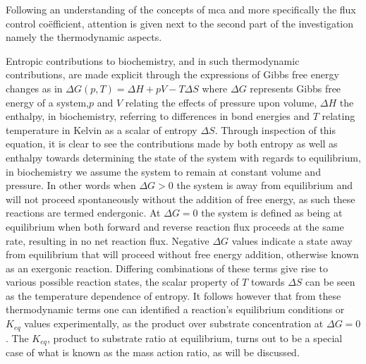 Following an understanding of the concepts of \gls{mca} and more specifically the flux control co\"efficient, attention is given next to the second part of the investigation namely the thermodynamic aspects.



Entropic contributions to biochemistry, and in such thermodynamic contributions, are made explicit through the expressions of Gibbs free energy changes as in $\Delta G(p,T)=\Delta H+pV-T\Delta S$ where $\Delta G$ represents Gibbs free energy of a system,$p$ and $V$ relating the effects of pressure upon volume, $\Delta H$ the enthalpy, in biochemistry, referring to differences in bond energies and $T$ relating temperature in Kelvin as a scalar of entropy $\Delta S$. Through inspection of this equation, it is clear to see the contributions made by both entropy as well as enthalpy towards determining the state of the system with regards to equilibrium, in biochemistry we assume the system to remain at constant volume and pressure. In other words when $\Delta G > 0$ the system is away from equilibrium and will not proceed spontaneously without the addition of free energy, as such these reactions are termed endergonic. At $\Delta G = 0$ the system is defined as being at equilibrium when both forward and reverse reaction flux proceeds at the same rate, resulting in no net reaction flux. Negative $\Delta G$ values indicate a state away from equilibrium that will proceed without free energy addition, otherwise known as an exergonic reaction. Differing combinations of these terms give rise to various possible reaction states, the scalar property of $T$ towards $\Delta S$ can be seen as the temperature dependence of entropy. It follows however that from these thermodynamic terms one can identified a reaction's equilibrium conditions or $K_{eq}$ values experimentally, as the product over substrate concentration at $\Delta G =0$. The $K_{eq}$, product to substrate ratio at equilibrium, turns out to be a special case of what is known as the mass action ratio, as will be discussed.

